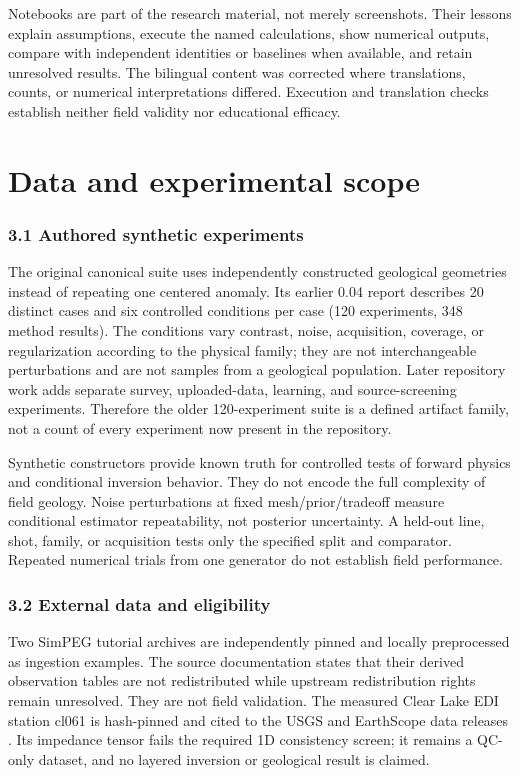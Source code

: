 Notebooks are part of the research material, not merely screenshots.
Their lessons explain assumptions, execute the named calculations, show
numerical outputs, compare with independent identities or baselines when
available, and retain unresolved results. The bilingual content was
corrected where translations, counts, or numerical interpretations
differed. Execution and translation checks establish neither field
validity nor educational efficacy.

\section{Data and experimental scope}\label{data-and-experimental-scope}

\subsubsection{3.1 Authored synthetic
experiments}\label{authored-synthetic-experiments}

The original canonical suite uses independently constructed geological
geometries instead of repeating one centered anomaly. Its earlier 0.04
report describes 20 distinct cases and six controlled conditions per
case (120 experiments, 348 method results). The conditions vary
contrast, noise, acquisition, coverage, or regularization according to
the physical family; they are not interchangeable perturbations and are
not samples from a geological population. Later repository work adds
separate survey, uploaded-data, learning, and source-screening
experiments. Therefore the older 120-experiment suite is a defined
artifact family, not a count of every experiment now present in the
repository.

Synthetic constructors provide known truth for controlled tests of
forward physics and conditional inversion behavior. They do not encode
the full complexity of field geology. Noise perturbations at fixed
mesh/prior/tradeoff measure conditional estimator repeatability, not
posterior uncertainty. A held-out line, shot, family, or acquisition
tests only the specified split and comparator. Repeated numerical trials
from one generator do not establish field performance.

\subsubsection{3.2 External data and
eligibility}\label{external-data-and-eligibility}

Two SimPEG tutorial archives are independently pinned and locally
preprocessed as ingestion examples. The source documentation states that
their derived observation tables are not redistributed while upstream
redistribution rights remain unresolved. They are not field validation.
The measured Clear Lake EDI station cl061 is hash-pinned and cited to
the USGS and EarthScope data releases
\cite{usgsClearLake,earthscopeClearLake}. Its impedance tensor fails the
required 1D consistency screen; it remains a QC-only dataset, and no
layered inversion or geological result is claimed.

